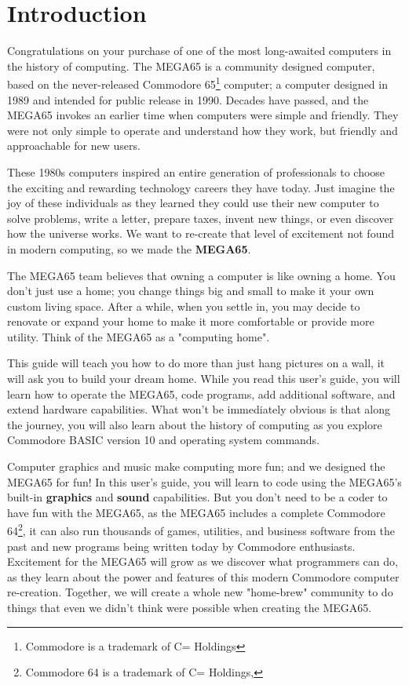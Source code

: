\chapter{Introduction}

Congratulations on your purchase of one of the most long-awaited computers in the history of computing. The MEGA65 is a community designed computer, based on the never-released Commodore{\textregistered} 65\footnote{Commodore is a trademark of C= Holdings} computer; a computer designed in 1989 and intended for public release in 1990. Decades have passed, and the MEGA65 invokes an earlier time when computers were simple and friendly. They were not only simple to operate and understand how they work, but friendly and approachable for new users.

These 1980s computers inspired an entire generation of professionals to choose the exciting and rewarding technology careers they have today. Just imagine the joy of these individuals as they learned they could use their new computer to solve problems, write a letter, prepare taxes, invent new things, or even discover how the universe works. We want to re-create that level of excitement not found in modern computing, so we made the {\bf MEGA65}.

The MEGA65 team believes that owning a computer is like owning a home. You don't just use a home; you change things big and small to make it your own custom living space. After a while, when you settle in, you may decide to renovate or expand your home to make it more comfortable or provide more utility. Think of the MEGA65 as a "computing home".

This guide will teach you how to do more than just hang pictures on a wall, it will ask you to build your dream home. While you read this user's guide, you will learn how to operate the MEGA65, code programs, add additional software, and extend hardware capabilities. What won't be immediately obvious is that along the journey, you will also learn about the history of computing as you explore Commodore BASIC version 10 and operating system commands.

Computer graphics and music make computing more fun; and we designed the MEGA65 for fun! In this user's guide, you will learn to code using the MEGA65's built-in {\bf graphics} and {\bf sound} capabilities. But you don't need to be a coder to have fun with the MEGA65, as the MEGA65 includes a complete Commodore{\textregistered} 64{\texttrademark}\footnote{Commodore 64 is a trademark of C= Holdings, }, it can also run thousands of games, utilities, and business software from the past and new programs being written today by Commodore enthusiasts. Excitement for the MEGA65 will grow as we discover what programmers can do, as they learn about the power and features of this modern Commodore computer re-creation. Together, we will create a whole new "home-brew" community to do things that even we didn't think were possible when creating the MEGA65.

